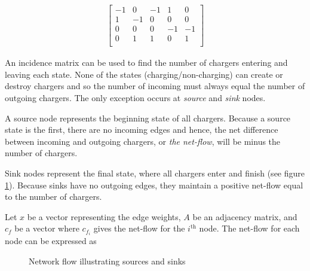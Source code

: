 \begin{align}
	\begin{bmatrix}
		-1 & 0 & -1 & 1 & 0 \\
		1 & -1 & 0 & 0 & 0 \\
		0 & 0 & 0 & -1 & -1 \\
		0 & 1 & 1 & 0 & 1 \\
	\end{bmatrix}
\end{align}
\par  An incidence matrix can be used to find the number of chargers entering and leaving each state. None of the states (charging/non-charging) can create or destroy chargers and so the number of incoming must always equal the number of outgoing chargers. The only exception occurs at \textit{source} and \textit{sink} nodes.
\par A source node represents the beginning state of all chargers.  Because a source state is the first, there are no incoming edges and hence, the net difference between incoming and outgoing chargers, or \textit{the net-flow}, will be minus the number of chargers. 
\par Sink nodes represent the final state, where all chargers enter and finish (see figure \ref{fig:sourceSink}). Because sinks have no outgoing edges, they maintain a positive net-flow equal to the number of chargers. 
\par Let $x$ be a vector representing the edge weights, $A$ be an adjacency matrix, and $c_f$ be a vector where $c_{f_i}$ gives the net-flow for the $i^{\text{th}}$ node. The net-flow for each node can be expressed as 

\begin{figure}
	\centering
{}
	\caption{Network flow illustrating sources and sinks}
	\label{fig:sourceSink} 
\end{figure} 

